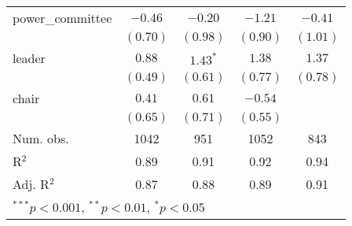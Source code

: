 \documentclass[12pt]{article}
\begin{document}
\begin{table}[H]
\begin{center}
\begin{tabular}{l c c c c }
			power\_committee              & $-0.46$      & $-0.20$       & $-1.21$       & $-0.41$      \\
			& $(0.70)$     & $(0.98)$      & $(0.90)$      & $(1.01)$     \\
			leader                        & $0.88$       & $1.43^{*}$    & $1.38$        & $1.37$       \\
			& $(0.49)$     & $(0.61)$      & $(0.77)$      & $(0.78)$     \\
			chair                         & $0.41$       & $0.61$        & $-0.54$       &              \\
			& $(0.65)$     & $(0.71)$      & $(0.55)$      &              \\
			\hline
			Num. obs.                     & 1042         & 951           & 1052          & 843          \\
			R$^2$            & 0.89         & 0.91          & 0.92          & 0.94         \\
			Adj. R$^2$       & 0.87         & 0.88          & 0.89          & 0.91         \\
			\hline
			\multicolumn{5}{l}{\scriptsize{$^{***}p<0.001$, $^{**}p<0.01$, $^*p<0.05$}}
		\end{tabular}
	\end{center}
\end{table}
\end{document}
